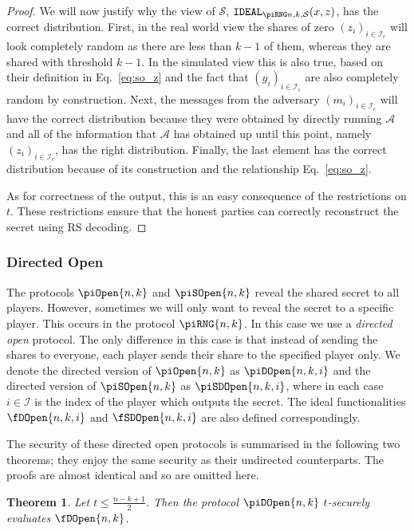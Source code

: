 \documentclass{article}
\newtheorem{theorem}{Theorem}
\theoremstyle{remark}
\begin{document}
\begin{proof}
	We will now justify why the view of $\mathcal{S}$, $\idealD$, has the
	correct distribution. First, in the real world view the shares of zero
	${(z_i)}_{i \in \mathcal{I}_c}$ will look completely random as there are
	less than $k - 1$ of them, whereas they are shared with threshold $k - 1$.
	In the simulated view this is also true, based on their definition in
	Eq.~\eqref{eq:so_z} and the fact that ${(y_i)}_{i \in \mathcal{I}_c}$ are
	also completely random by construction. Next, the messages from the
	adversary ${(m_i)}_{i \in \mathcal{I}_c}$ will have the correct
	distribution because they were obtained by directly running $\mathcal{A}$
	and all of the information that $\mathcal{A}$ has obtained up until this
	point, namely ${(z_i)}_{i \in \mathcal{I}_c}$, has the right distribution.
	Finally, the last element has the correct distribution because of its
	construction and the relationship Eq.~\eqref{eq:so_z}.

	As for correctness of the output, this is an easy consequence of the
	restrictions on $t$. These restrictions ensure that the honest parties can
	correctly reconstruct the secret using RS decoding.
\end{proof}

\subsubsection{Directed Open}

The protocols $\piOpen{n,k}$ and $\piSOpen{n,k}$ reveal the shared secret to
all players. However, sometimes we will only want to reveal the secret to a
specific player. This occurs in the protocol $\piRNG{n,k}$. In this case we use
a \textit{directed open} protocol. The only difference in this case is that
instead of sending the shares to everyone, each player sends their share to the
specified player only. We denote the directed version of $\piOpen{n,k}$ as
$\piDOpen{n,k,i}$ and the directed version of $\piSOpen{n,k}$ as
$\piSDOpen{n,k,i}$, where in each case $i \in \mathcal{I}$ is the index of the
player which outputs the secret. The ideal functionalities $\fDOpen{n,k,i}$ and
$\fSDOpen{n,k,i}$ are also defined correspondingly.

The security of these directed open protocols is summarised in the following
two theorems; they enjoy the same security as their undirected counterparts.
The proofs are almost identical and so are omitted here.

\begin{theorem}
	Let $t \le \frac{n - k + 1}{2}$. Then the protocol $\piDOpen{n,k}$
	$t$-securely evaluates $\fDOpen{n,k}$.
\end{theorem}
\end{document}
